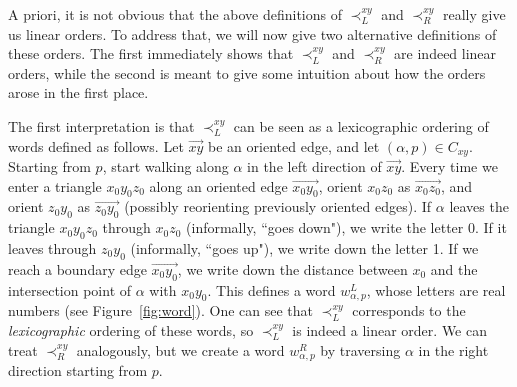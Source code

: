 \documentclass[11pt]{amsart}
\theoremstyle{definition}
\begin{document}
A priori, it is not obvious that the above definitions of $\prec_L^{xy}$ and $\prec_R^{xy}$ really give us linear orders. 
To address that, we will now give two alternative definitions of these orders.
The first immediately shows that  $\prec_L^{xy}$ and $\prec_R^{xy}$ are indeed linear orders, while the second is meant to give some intuition about how the orders arose in the first place.

\noindent
\begin{minipage}[t]{0.57\textwidth}
\setlength{\parindent}{\normalparindent}\indent
The first interpretation is that $\prec_L^{xy}$ can be seen as a lexicographic ordering of words defined as follows.
Let $\vec{xy}$ be an oriented edge, and let $(\alpha,p)\in C_{xy}$. Starting from $p$, start walking along $\alpha$ in the left direction of $\vec{xy}$. 
Every time we enter a triangle $x_0y_0z_0$ along an oriented edge $\vec{x_0y_0}$, orient  $x_0z_0$ as $\vec{x_0z_0}$, and orient $z_0y_0$ as $\vec{z_0y_0}$ (possibly reorienting previously oriented edges). 
If $\alpha$ leaves the triangle $x_0y_0z_0$ through $x_0z_0$ (informally, ``goes down"), we write the letter 0. If it leaves through $z_0y_0$ (informally, ``goes up"), we write down the letter 1. 
If we reach a boundary edge $\vec{x_0y_0}$, we write down the distance between $x_0$ and the intersection point of $\alpha$ with $x_0y_0$. 
This defines a word $w_{\alpha,p}^L$, whose letters are real numbers (see Figure~\ref{fig:word}). 
One can see that $\prec_{L}^{xy}$ corresponds to the \emph{lexicographic} ordering of these words, so $\prec_{L}^{xy}$ is indeed a linear order. 
We can treat $\prec_{R}^{xy}$ analogously, but we create a word $w^{R}_{\alpha,p}$ by traversing $\alpha$ in the right direction starting from $p$.\strut
\end{minipage}\hfill
\end{document}
